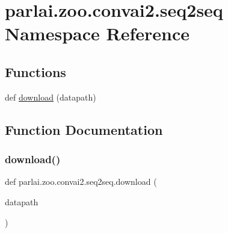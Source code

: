 \hypertarget{namespaceparlai_1_1zoo_1_1convai2_1_1seq2seq}{}\section{parlai.\+zoo.\+convai2.\+seq2seq Namespace Reference}
\label{namespaceparlai_1_1zoo_1_1convai2_1_1seq2seq}
\subsection*{Functions}
\begin{DoxyCompactItemize}
\item 
def \hyperlink{namespaceparlai_1_1zoo_1_1convai2_1_1seq2seq_a85645a8dbd4e8a3d67f8acb231de4f6b}{download} (datapath)
\end{DoxyCompactItemize}


\subsection{Function Documentation}
\mbox{\label{namespaceparlai_1_1zoo_1_1convai2_1_1seq2seq_a85645a8dbd4e8a3d67f8acb231de4f6b}} 
\subsubsection{\texorpdfstring{download()}{download()}}
{\footnotesize\ttfamily def parlai.\+zoo.\+convai2.\+seq2seq.\+download (\begin{DoxyParamCaption}\item[{}]{datapath }\end{DoxyParamCaption})}

